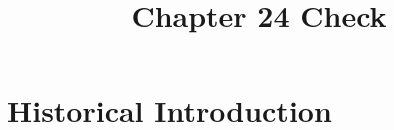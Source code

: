 \documentclass[11pt,a4paper]{article}
\title{Chapter 24 Check}
\author{}
\numberwithin{equation}{subsection}
\begin{document}
\maketitle
\setcounter{section}{23}
\section{Historical Introduction}






\end{document}
